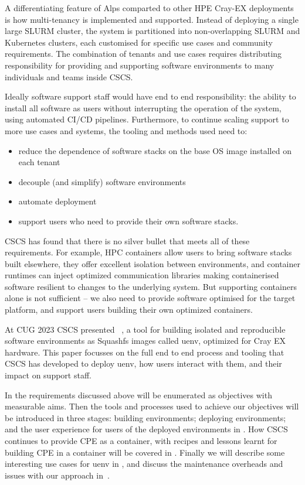 A differentiating feature of Alps comparted to other HPE Cray-EX deployments is how multi-tenancy is implemented and supported.
Instead of deploying a single large SLURM cluster, the system is partitioned into non-overlapping SLURM and Kubernetes clusters, each customised for specific use cases and community requirements.
The combination of tenants and use cases requires distributing responsibility for providing and supporting software environments to many individuals and teams inside CSCS.

Ideally software support staff would have end to end responsibility: the ability to install all software as users without interrupting the operation of the system, using automated CI/CD pipelines.
Furthermore, to continue scaling support to more use cases and systems, the tooling and methods used need to:
\begin{itemize}
    \item reduce the dependence of software stacks on the base OS image installed on each tenant
    \item decouple (and simplify) software environments
    \item automate deployment
    \item support users who need to provide their own software stacks.
\end{itemize}

CSCS has found that there is no silver bullet that meets all of these requirements.
For example, HPC containers allow users to bring software stacks built elsewhere, they offer excellent isolation between environments, and container runtimes can inject optimized communication libraries making containerised software resilient to changes to the underlying system.
But supporting containers alone is not sufficient -- we also need to provide software optimised for the target platform, and support users building their own optimized containers.

At CUG 2023 CSCS presented \stackinator~\cite{uenv2023}, a tool for building isolated and reproducible software environments as Squashfs images called uenv, optimized for Cray EX hardware.
This paper focusses on the full end to end process and tooling that CSCS has developed to deploy uenv, how users interact with them, and their impact on support staff.

In  the requirements discussed above will be enumerated as objectives with measurable aims.
Then the tools and processes used to achieve our objectives will be introduced in three stages: building environments; deploying environments; and the user experience for users of the deployed environments in .
How CSCS continues to provide CPE as a container, with recipes and lessons learnt for building CPE in a container will be covered in .
Finally we will describe some interesting use cases for uenv in , and discuss the maintenance overheads and issues with our approach in~.

